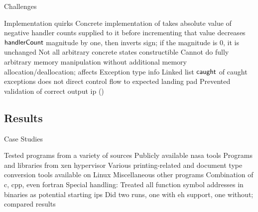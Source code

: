 \begin{frame}{Challenges}
  \begin{outline}
    \1 Implementation quirks
      \2 Concrete implementation of  takes absolute value of negative handler counts supplied to it before incrementing that value
      \2  decreases $\mathsf{handlerCount}$ magnitude by one, then inverts sign; if the magnitude is 0, it is unchanged
    \1 Not all arbitrary concrete states constructible
      \2 Cannot do fully arbitrary memory manipulation without additional memory allocation/deallocation; affects
        \3 Exception type info
        \3 Linked list $\mathsf{caught}$ of caught exceptions
    \1  does not direct control flow to expected landing pad
      \2 Prevented validation of correct output \gls{ip} (\rip)
  \end{outline}
\end{frame}

\subsection{Results}
\begin{frame}{Case Studies}
  \begin{outline}
    \1 Tested  programs from a variety of sources
      \2 Publicly available \gls{nasa} tools
      \2 Programs and libraries from \gls{xen} hypervisor
      \2 Various printing-related and document type conversion tools available on Linux
      \2 Miscellaneous other programs
    \1 Combination of \gls{c}, \gls{cpp}, even \gls{fortran}
    \1 Special handling:
      \2 Treated all function symbol addresses in binaries as potential starting \glspl{ip}
      \2 Did two runs, one with \gls{eh} support, one without; compared results
  \end{outline}
\end{frame}


